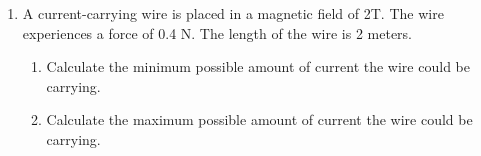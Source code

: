 \documentclass[letterpaper, 12pt]{article}
\begin{document}
\begin{enumerate}
	\vspace{1.25in}
	\item A current-carrying wire is placed in a magnetic field of 2T.  The wire experiences a force of 0.4 N.    The length of the wire is 2 meters.
	
	\begin{enumerate}
		\item Calculate the minimum possible amount of current the wire could be carrying.
		\vspace{1.5in}
		\item Calculate the maximum possible amount of current the wire could be carrying.
	\end{enumerate}
	
\end{enumerate}
 
\end{document}
